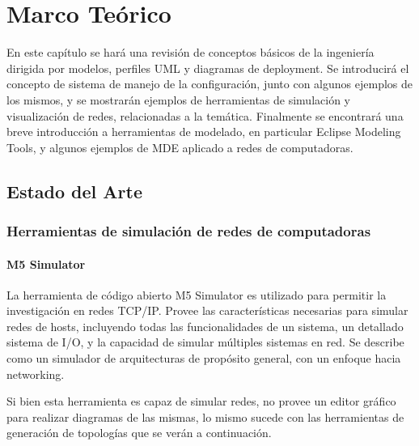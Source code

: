 \chapter{Marco Teórico} \label{Marco Teorico}

En este capítulo se hará una revisión de conceptos básicos de la ingeniería dirigida por modelos, perfiles UML y diagramas de deployment. Se introducirá el concepto de sistema de manejo de la configuración, junto con algunos ejemplos de los mismos, y se mostrarán ejemplos de herramientas de simulación y visualización de redes, relacionadas a la temática. Finalmente se encontrará una breve introducción a herramientas de modelado, en particular Eclipse Modeling Tools, y algunos ejemplos de MDE aplicado a redes de computadoras.

\section{Estado del Arte}
\subsection{Herramientas de simulación de redes de computadoras} \label{Herramientas de simulación}
\subsubsection{M5 Simulator}
La herramienta de código abierto M5 Simulator es utilizado para permitir la investigación en redes TCP/IP. Provee las características necesarias para simular redes de hosts, incluyendo todas las funcionalidades de un sistema, un detallado sistema de I/O, y la capacidad de simular múltiples sistemas en red.
Se describe como un simulador de arquitecturas de propósito general, con un enfoque hacia networking. \cite{binkert2006m5}

Si bien esta herramienta es capaz de simular redes, no provee un editor gráfico para realizar diagramas de las mismas, lo mismo sucede con las herramientas de generación de topologías que se verán a continuación.
